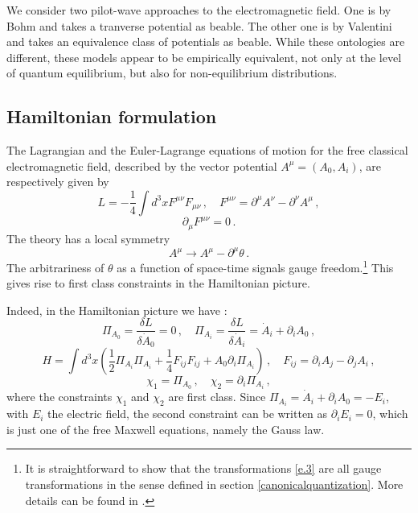 \documentclass[12pt]{article}
\def\pa{\partial}
\begin{document}
We consider two pilot-wave approaches to the electromagnetic field. One is by Bohm and takes a tranverse potential as beable. The other one is by Valentini and takes an equivalence class of potentials as beable. While these ontologies are different, these models appear to be empirically equivalent, not only at the level of quantum equilibrium, but also for non-equilibrium distributions.    


\subsection{Hamiltonian formulation}
The Lagrangian and the Euler-Lagrange equations of motion for the free classical electromagnetic field, described by the vector potential $A^{\mu}=(A_0,A_i)$, are respectively given by
\begin{equation}
L =  -\frac{1}{4}\int d^3 x  F^{\mu \nu}F_{\mu \nu}\,,\quad F^{\mu \nu} = \partial^\mu A^{\nu} - \partial^\nu A^{\mu}\,,
\label{e.1}
\end{equation}
\begin{equation}
\partial_\mu F^{\mu \nu} = 0\,.
\label{e.2}
\end{equation}
The theory has a local symmetry 
\begin{equation}
A^{\mu} \to A^{\mu} - \partial^\mu  \theta\,.
\label{e.3}
\end{equation}
The arbitrariness of $\theta$ as a function of space-time signals gauge freedom.{\footnote{It is straightforward to show that the transformations \eqref{e.3} are all gauge transformations in the sense defined in section \ref{canonicalquantization}. More details can be found in \cite{struyve09c}.}} This gives rise to first class constraints in the Hamiltonian picture.

Indeed, in the Hamiltonian picture we have \cite{hanson76,sundermeyer82,gitman90,henneaux91}:
\begin{equation}
\Pi_{A_0} = \frac{\delta L }{\delta {\dot A_0} } = 0\,, \quad \Pi_{A_i} = \frac{\delta L }{\delta {\dot A_i} } = {\dot A}_i +\partial_i A_0 \,,
\label{e.4}
\end{equation}
\begin{equation}
H = \int d^3 x \left( \frac{1}{2}\Pi_{A_i}\Pi_{A_i} + \frac{1}{4} F_{ij}F_{ij} +A_0\partial_i \Pi_{A_i} \right)\,,\quad  F_{ij}=\partial_i A_j - \partial_j A_i\,,
\label{e.5}
\end{equation}
\begin{equation}
\chi_{1} = \Pi_{A_0} \,, \quad \chi_{2} = \partial_i \Pi_{A_i}\,,
\label{e.5.1}
\end{equation}
where the constraints $\chi_{1}$ and $\chi_{2}$ are first class. Since $\Pi_{A_i}={\dot A}_i +\partial_i A_0 = -E_i$, with $E_i$ the electric field, the second constraint can be written as $\pa_i E_i =0$, which is just one of the free Maxwell equations, namely the Gauss law.
\end{document}
